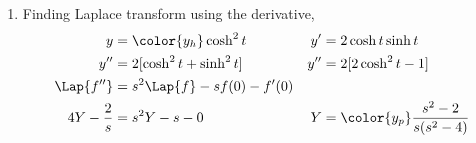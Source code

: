 \begin{enumerate}
    \item Finding Laplace transform using the derivative,
          \begin{align}
              y                & = \color{y_h} \cosh^2 t        &
              y'               & = 2\cosh t \sinh t               \\
              y''              & = 2[\cosh^2 t + \sinh^2 t]     &
              y''              & = 2[2\cosh^2 t - 1]              \\
              \Lap\{f''\}      & = s^2\Lap\{f\} - sf(0) - f'(0)   \\
              4Y - \frac{2}{s} & = s^2Y - s - 0                 &
              Y                & = \color{y_p}\frac{s^2-2}
              {s(s^2 - 4)}
          \end{align}


\end{enumerate}
